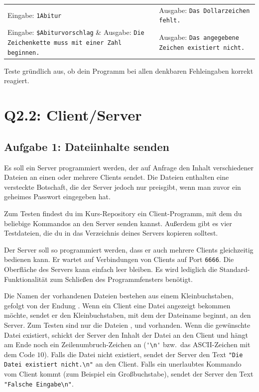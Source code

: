 \bgroup
\def\arraystretch{1.2}
\begin{tabularx}{\textwidth}{p{50mm} X}
Eingabe: \lstinline|1Abitur| &
Ausgabe: \lstinline|Das Dollarzeichen fehlt.| \\
Eingabe: \lstinline|$Abiturvorschlag| &
Ausgabe: \lstinline|Die Zeichenkette muss mit einer Zahl beginnen.| \\
Eingabe: \lstinline|10$Abitur| &
Ausgabe: \lstinline|Das angegebene Zeichen existiert nicht.| \\
\end{tabularx}
\egroup

Teste gründlich aus, ob dein Programm bei allen denkbaren Fehleingaben korrekt reagiert.


\section{Q2.2: Client/Server}

\subsection{Aufgabe 1: Dateiinhalte senden}

Es soll ein Server programmiert werden, der auf Anfrage den Inhalt
verschiedener Dateien an einen oder mehrere Clients sendet. Die Dateien
enthalten eine versteckte Botschaft, die der Server jedoch nur preisgibt, wenn
man zuvor ein geheimes Passwort eingegeben hat.

Zum Testen findest du im Kurs-Repository ein Client-Programm, mit dem du
beliebige Kommandos an den Server senden kannst. Außerdem gibt es vier
Testdateien, die du in das Verzeichnis deines Servers kopieren solltest.

Der Server soll so programmiert werden, dass er auch mehrere Clients
gleichzeitig bedienen kann. Er wartet auf Verbindungen von Clients auf Port
\lstinline|6666|. Die Oberfläche des Servers kann einfach leer bleiben. Es wird
lediglich die Standard-Funktionalität zum Schließen des Programmfensters
benötigt.

Die Namen der vorhandenen Dateien bestehen aus einem Kleinbuchstaben, gefolgt
von der Endung . Wenn ein Client eine Datei angezeigt bekommen
möchte, sendet er den Kleinbuchstaben, mit dem der Dateiname beginnt, an den
Server. Zum Testen sind nur die Dateien ,  und
 vorhanden. Wenn die gewünschte Datei existiert, schickt der
Server den Inhalt der Datei an den Client und hängt am Ende noch ein
Zeilenumbruch-Zeichen an (\lstinline|'\n'| bzw.\ das ASCII-Zeichen mit dem Code
$10$). Falls die Datei nicht existiert, sendet der Server den Text 
\lstinline|"Die Datei existiert nicht.\n"| an den Client. Falls ein unerlaubtes
Kommando vom Client kommt (zum Beispiel ein Großbuchstabe), sendet der Server
den Text \lstinline|"Falsche Eingabe\n"|.

